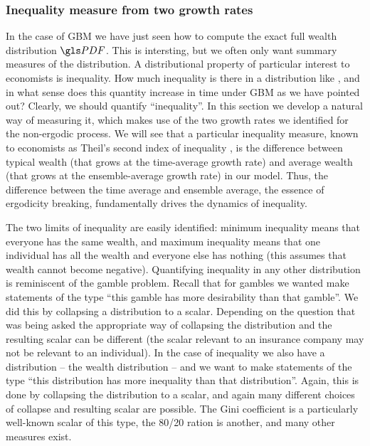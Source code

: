 \subsubsection{Inequality measure from two growth rates}
In the case of GBM we have just seen how to 
compute the exact full wealth distribution $\PDF$. This is intersting, but
we often only want summary measures of the distribution. A distributional property of particular 
interest to economists is inequality. How much inequality is there in a distribution like , 
and in what sense does this quantity increase in time under GBM as we have pointed out?
Clearly, we should quantify ``inequality''. In this section we develop a natural way of measuring it, 
which makes use of the two growth rates we identified for the non-ergodic process. We will see 
that a particular inequality measure, known to economists as
Theil's second index of inequality \cite{Theil1967}, is the difference
between typical wealth (that grows at the time-average growth rate) and average wealth 
(that grows at the ensemble-average growth rate) in our model. Thus, the difference between
the time average and ensemble average, the essence of ergodicity breaking, 
fundamentally drives  the dynamics of inequality.

The two limits of inequality are easily identified: minimum inequality means that everyone 
has the same wealth, and maximum inequality means that one individual has all the 
wealth and everyone else has nothing (this assumes that wealth cannot become 
negative). Quantifying inequality in any other distribution is reminiscent of the gamble 
problem. Recall that for gambles we wanted make statements of the type ``this gamble 
has more desirability than that gamble''. We did this by collapsing a distribution to a 
scalar. Depending on the question that was being asked 
the appropriate way of collapsing the distribution and the resulting scalar can be different 
(the scalar relevant to an insurance company may not be relevant to an individual). 
In the case of inequality we also have a distribution -- the wealth distribution -- and we 
want to make statements of the type ``this distribution has more inequality than that 
distribution''. Again, this is done by collapsing the distribution to a scalar, and again 
many different choices of collapse and resulting scalar are possible. The Gini 
coefficient is a particularly well-known scalar of this type, the 80/20 ration is another, 
and many other measures exist.


